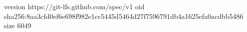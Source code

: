 version https://git-lfs.github.com/spec/v1
oid sha256:8aa3cfd0ef6e698f982e1cc5445d5464d27f7596791db4a1625efa0acdbb5486
size 6049
